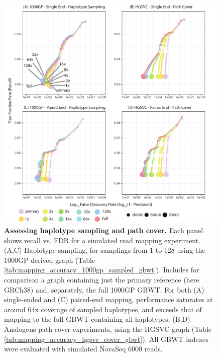 \documentclass[11pt]{ucscthesis}
\begin{document}
\begin{figure}[H]
    \centering
    \includegraphics[width=.9\linewidth]{aim2_haplotype_sampling.pdf}
    \caption[Assessing haplotype sampling and path cover]{\textbf{Assessing haplotype sampling and path cover.} Each panel shows recall vs. FDR for a simulated read mapping experiment. (A,C) Haplotype sampling, for samplings from 1 to 128 using the 1000GP derived graph (Table \ref{tab:mapping_accuracy_1000gp_sampled_gbwt}). Includes for comparison a graph containing just the primary reference (here GRCh38) and, separately, the full 1000GP GBWT. For both (A) single-ended and (C) paired-end mapping, performance saturates at around 64x coverage of sampled haplotypes, and exceeds that of mapping to the full GBWT containing all haplotypes. (B,D) Analogous path cover experiments, using the HGSVC graph (Table \ref{tab:mapping_accuracy_hgsvc_cover_gbwt}). All GBWT indexes were evaluated with simulated NovaSeq 6000 reads.}
    \label{fig:aim2_supplement_haplotype_sampling}
\end{figure}
\end{document}
